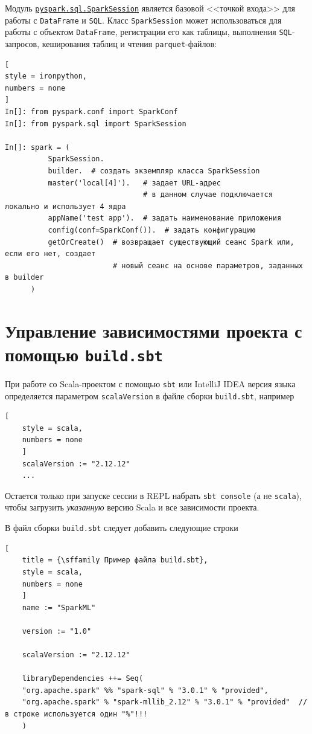 \documentclass[%
	11pt,
	a4paper,
	utf8,
		]{article}
\begin{document}
Модуль \href{https://spark.apache.org/docs/latest/api/python/pyspark.sql.html?highlight=read%20csv}{\texttt{pyspark.sql.SparkSession}} является базовой <<точкой входа>> для работы с \texttt{DataFrame} и \texttt{SQL}. Класс \texttt{SparkSession} может использоваться для работы с объектом \texttt{DataFrame}, регистрации его как таблицы, выполнения \texttt{SQL}-запросов, кеширования таблиц и чтения \texttt{parquet}-файлов:

\begin{lstlisting}[
style = ironpython,
numbers = none
]
In[]: from pyspark.conf import SparkConf
In[]: from pyspark.sql import SparkSession

In[]: spark = (
          SparkSession.
          builder.  # создать экземпляр класса SparkSession
          master('local[4]').   # задает URL-адрес
                                # в данном случае подключается локально и использует 4 ядра
          appName('test app').  # задать наименование приложения
          config(conf=SparkConf()).  # задать конфигурацию
          getOrCreate()  # возвращает существующий сеанс Spark или, если его нет, создает
                         # новый сеанс на основе параметров, заданных в builder
      )
\end{lstlisting}

\section{Управление зависимостями проекта с помощью \texttt{build.sbt}}

При работе со Scala-проектом с помощью \texttt{sbt} или IntelliJ IDEA версия языка определяется параметром \texttt{scalaVersion} в файле сборки \texttt{build.sbt}, например
\begin{lstlisting}[
	style = scala,
	numbers = none	
	]
	scalaVersion := "2.12.12"
	...
\end{lstlisting}

Остается только при запуске сессии в REPL набрать \texttt{sbt console} (а не \texttt{scala}), чтобы загрузить \emph{указанную} версию Scala и все зависимости проекта.

В файл сборки \texttt{build.sbt} следует добавить следующие строки
\begin{lstlisting}[
	title = {\sffamily Пример файла build.sbt},
	style = scala,
	numbers = none	
	]
	name := "SparkML"
	
	version := "1.0"
	
	scalaVersion := "2.12.12"
	
	libraryDependencies ++= Seq(
	"org.apache.spark" %% "spark-sql" % "3.0.1" % "provided",
	"org.apache.spark" % "spark-mllib_2.12" % "3.0.1" % "provided"  // в строке используется один "%"!!!
	)
\end{lstlisting}
\end{document}
